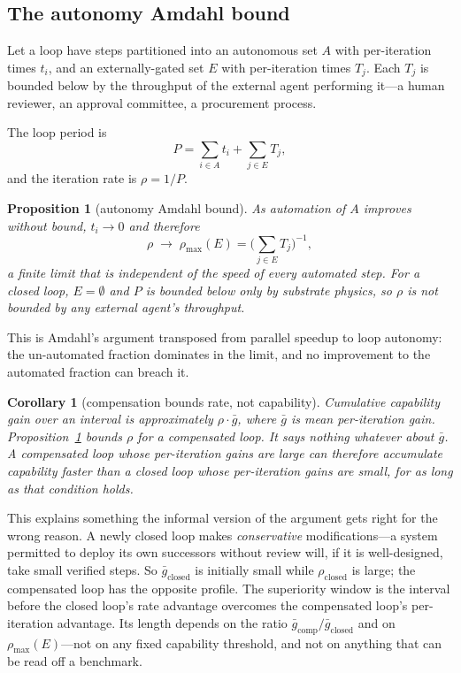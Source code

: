 \documentclass[11pt]{article}
\newtheorem{proposition}{Proposition}
\newtheorem{corollary}{Corollary}
\begin{document}
\subsection{The autonomy Amdahl bound}

Let a loop have steps partitioned into an autonomous set $A$ with per-iteration times $t_i$, and an externally-gated set $E$ with per-iteration times $T_j$. Each $T_j$ is bounded below by the throughput of the external agent performing it---a human reviewer, an approval committee, a procurement process.

The loop period is
\[
P = \sum_{i \in A} t_i + \sum_{j \in E} T_j,
\]
and the iteration rate is $\rho = 1/P$.

\begin{proposition}[autonomy Amdahl bound]
\label{prop:amdahl}
As automation of $A$ improves without bound, $t_i \to 0$ and therefore
\[
\rho \;\longrightarrow\; \rho_{\max}(E) = \Big(\sum_{j \in E} T_j\Big)^{-1},
\]
a finite limit that is independent of the speed of every automated step. For a closed loop, $E = \emptyset$ and $P$ is bounded below only by substrate physics, so $\rho$ is not bounded by any external agent's throughput.
\end{proposition}

This is Amdahl's \citeyearpar{amdahl1967} argument transposed from parallel speedup to loop autonomy: the un-automated fraction dominates in the limit, and no improvement to the automated fraction can breach it.

\begin{corollary}[compensation bounds rate, not capability]
\label{cor:rate}
Cumulative capability gain over an interval is approximately $\rho \cdot \bar{g}$, where $\bar{g}$ is mean per-iteration gain. Proposition~\ref{prop:amdahl} bounds $\rho$ for a compensated loop. It says nothing whatever about $\bar{g}$. A compensated loop whose per-iteration gains are large can therefore accumulate capability faster than a closed loop whose per-iteration gains are small, for as long as that condition holds.
\end{corollary}

This explains something the informal version of the argument gets right for the wrong reason. A newly closed loop makes \emph{conservative} modifications---a system permitted to deploy its own successors without review will, if it is well-designed, take small verified steps. So $\bar{g}_{\mathrm{closed}}$ is initially small while $\rho_{\mathrm{closed}}$ is large; the compensated loop has the opposite profile. The superiority window is the interval before the closed loop's rate advantage overcomes the compensated loop's per-iteration advantage. Its length depends on the ratio $\bar{g}_{\mathrm{comp}}/\bar{g}_{\mathrm{closed}}$ and on $\rho_{\max}(E)$---not on any fixed capability threshold, and not on anything that can be read off a benchmark.
\end{document}
